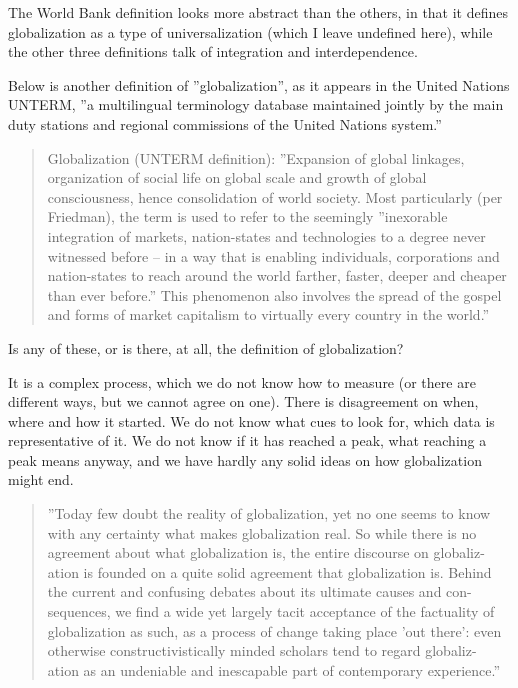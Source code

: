 \documentclass[graybox,envcountchap,sectrefs]{svmono}
\begin{document}
The World Bank definition looks more abstract than the others, in that it defines globalization as a type of universalization (which I leave undefined here), while the other three definitions talk of integration and interdependence.

Below is another definition of ''globalization'', as it appears in the United Nations UNTERM, ''a multilingual terminology database maintained jointly by the main duty stations and regional commissions of the United Nations system.''

\begin{quote}
Globalization (UNTERM definition): ''Expansion of global linkages, organization of social life on global scale and growth of global consciousness, hence consolidation of world society. Most particularly (per Friedman), the term is used to refer to the seemingly ''inexorable integration of markets, nation-states and technologies to a degree never witnessed before -- in a way that is enabling individuals, corporations and nation-states to reach around the world farther, faster, deeper and cheaper than ever before.'' This phenomenon also involves the spread of the gospel and forms of market capitalism to virtually every country in the world.'' \cite{unterm-globalization}
\end{quote}

Is any of these, or is there, at all, the definition of globalization?

It is a complex process, which we do not know how to measure (or there are different ways, but we cannot agree on one). There is disagreement on when, where and how it started. We do not know what cues to look for, which data is representative of it. We do not know if it has reached a peak, what reaching a peak means anyway, and we have hardly any solid ideas on how globalization might end.

\begin{quote}
''Today few doubt the reality of globalization, yet no one seems to know with any certainty what makes globalization real. So while there is no agreement about what globalization is, the entire discourse on globaliz- ation is founded on a quite solid agreement that globalization is. Behind the current and confusing debates about its ultimate causes and con- sequences, we find a wide yet largely tacit acceptance of the factuality of globalization as such, as a process of change taking place 'out there': even otherwise constructivistically minded scholars tend to regard globaliz- ation as an undeniable and inescapable part of contemporary experience.'' \cite{bartelson2000three}
\end{quote}
\end{document}
